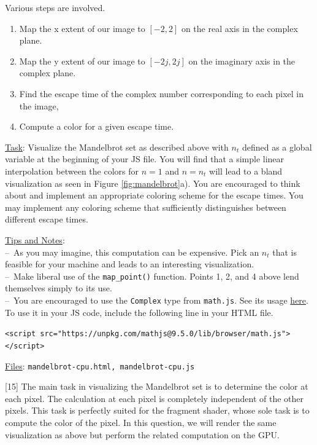 \documentclass[addpoints]{exam}
\begin{document}
\begin{questions}
  Various steps are involved.
  \begin{enumerate}
  \item Map the x extent of our image to $[-2,2]$ on the real axis in the complex plane.
  \item Map the y extent of our image to $[-2j,2j]$ on the imaginary axis in the complex plane.
  \item Find the escape time of the complex number corresponding to each pixel in the image,
  \item Compute a color for a given escape time.
  \end{enumerate}

  \underline{Task}: Visualize the Mandelbrot set as described above with $n_t$ defined as a global variable at the beginning of your JS file. You will find that a simple linear interpolation between the colors for $n=1$ and $n=n_t$ will lead to a bland visualization as seen in Figure \ref{fig:mandelbrot}a). You are encouraged to think about and implement an appropriate coloring scheme for the escape times. You may implement any coloring scheme that sufficiently distinguishes between different escape times.

  \underline{Tips and Notes}:\\
  --\ As you may imagine, this computation can be expensive. Pick an $n_t$ that is feasible for your machine and leads to an interesting visualization.\\
  --\ Make liberal use of the \texttt{map\_point()} function. Points 1, 2, and 4 above lend themselves simply to its use.\\
  --\ You are encouraged to use the \texttt{Complex} type from \texttt{math.js}. See its usage \href{https://mathjs.org/docs/datatypes/complex_numbers.html}{here}. To use it in your JS code, include the following line in your HTML file.\\
  \centerline{\texttt{<script src="https://unpkg.com/mathjs@9.5.0/lib/browser/math.js"></script>}}

  \noindent\underline{Files}: \texttt{mandelbrot-cpu.html, mandelbrot-cpu.js}

[15]
  The main task in visualizing the Mandelbrot set is to determine the color at each pixel. The calculation at each pixel is completely independent of the other pixels. This task is perfectly suited for the fragment shader, whose sole task is to compute the color of the pixel. In this question, we will render the same visualization as above but perform the related computation on the GPU.


\end{questions}
\end{document}
